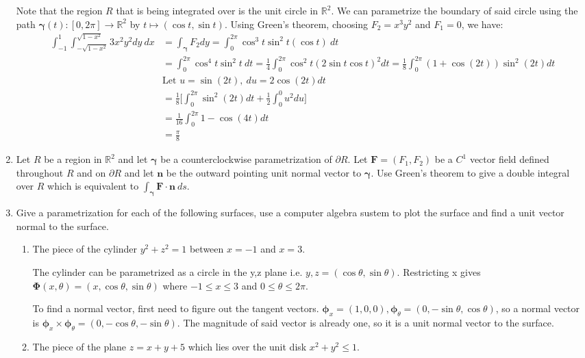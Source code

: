 \documentclass{article}
\newcommand{\gam}{\boldsymbol{\gamma}}
\begin{document}
\begin{enumerate}
    Note that the region $R$ that is being integrated over is the unit circle in $\mathbb{R}^2$. We can parametrize the boundary of said circle using the path $\gam(t):[0,2\pi] \rightarrow \mathbb{R}^2$ by $t \mapsto (\cos t, \sin t )$. Using Green's theorem, choosing $F_2 = x^3y^2$ and $F_1 = 0$, we have:
    \begin{align*}
        \int_{-1}^{1} \int_{-\sqrt{1-x^2}}^{\sqrt{1-x^2}}3x^2y^2dy\ dx &= \int_{\gam} F_2dy = \int_0^{2\pi} \cos^3t \sin^2t ( \cos t)\ dt \\
        &= \int_0^{2\pi} \cos^4t \sin^2t\ dt = \frac{1}{4}\int_0^{2\pi}\cos^2 t(2 \sin t \cos t)^2 dt = \frac{1}{8}\int_0^{2\pi} (1 + \cos(2t))\sin^2 (2t) dt \\
        &\text{Let }u = \sin(2t), \: du = 2\cos(2t)dt \\
        &= \frac{1}{8}\Bigg[ \int_0^{2\pi} \sin^2(2t) dt +  \frac{1}{2}\int_0^{0}u^2du\Bigg] \\
        &= \frac{1}{16} \int_0^{2\pi} 1 - \cos(4t) dt \\
        &= \frac{\pi}{8}
    \end{align*}
    \newpage
    \item Let $R$ be a region in $\mathbb{R}^2$ and let $\gam$ be a counterclockwise parametrization of $\partial R$. Let $\boldsymbol F = (F_1,F_2)$ be a $C^1$ vector field defined throughout $R$ and on $\partial R$ and let $\boldsymbol n$ be the outward pointing unit normal vector to $\gam$. Use Green's theorem to give a double integral over $R$ which is equivalent to $\displaystyle \int_{\gam} \boldsymbol F \cdot \boldsymbol n \ ds$.
    \newpage
    \item Give a parametrization for each of the following surfaces, use a computer algebra sustem to plot the surface and find a unit vector normal to the surface.
    \begin{enumerate}
        \item The piece of the cylinder $y^2 + z^2 = 1$ between $x = -1$ and $x = 3$.
        
        The cylinder can be parametrized as a circle in the y,z plane i.e. $y, z = (\cos \theta, \sin \theta)$. Restricting x gives $\boldsymbol \Phi (x, \theta) = (x, \cos \theta, \sin \theta)$ where $ -1 \leq x \leq 3$ and $0 \leq \theta \leq 2\pi$.
        
        To find a normal vector, first need to figure out the tangent vectors. $\boldsymbol \phi_x = (1,0,0), \boldsymbol \phi_{\theta} = (0, -\sin \theta, \cos \theta)$, so a normal vector is $\boldsymbol \phi_x \times \boldsymbol \phi_{\theta} = (0, -\cos \theta, - \sin \theta)$. The magnitude of said vector is already one, so it is a unit normal vector to the surface.
        \item The piece of the plane $z = x + y + 5$ which lies over the unit disk $x^2 + y^2 \leq 1$.
        

\end{enumerate}
\end{enumerate}
\end{document}
